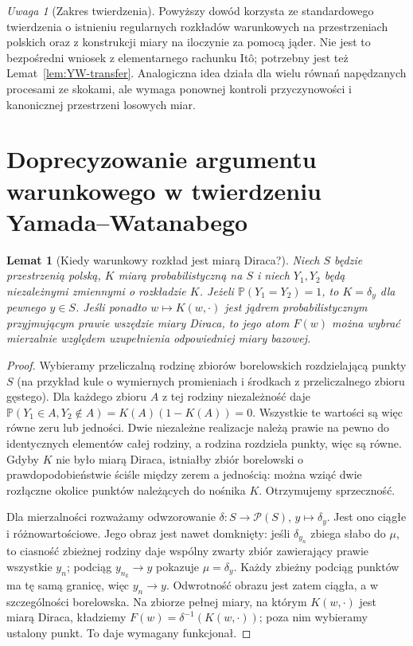 \documentclass[11pt,a4paper,oneside]{report}
\numberwithin{equation}{chapter}
\theoremstyle{plain}
\newtheorem{lemat}[twierdzenie]{Lemat}
\theoremstyle{definition}
\theoremstyle{remark}
\newtheorem{uwaga}{Uwaga}[chapter]
\newcommand{\Prob}{\mathbb{P}}
\begin{document}
\begin{uwaga}[Zakres twierdzenia]
Powyższy dowód korzysta ze standardowego twierdzenia o
istnieniu regularnych rozkładów warunkowych na przestrzeniach
polskich oraz z konstrukcji miary na iloczynie za pomocą jąder.
Nie jest to bezpośredni wniosek z elementarnego rachunku
Itô; potrzebny jest też Lemat~\ref{lem:YW-transfer}.
Analogiczna idea działa dla wielu równań napędzanych
procesami ze skokami, ale wymaga ponownej kontroli
przyczynowości i kanonicznej przestrzeni losowych miar.
\end{uwaga}


\section{Doprecyzowanie argumentu warunkowego w twierdzeniu Yamada--Watanabego}\label{sec:volIII:14:04}

\begin{lemat}[Kiedy warunkowy rozkład jest miarą Diraca?]\label{lem:volIII:14:03}
\label{lem:dirac-audit}
Niech $S$ będzie przestrzenią polską, $K$ miarą
probabilistyczną na $S$ i niech $Y_1,Y_2$ będą
niezależnymi zmiennymi o rozkładzie $K$. Jeżeli
$\Prob(Y_1=Y_2)=1$, to $K=\delta_y$ dla pewnego $y\in S$.
Jeśli ponadto $w\mapsto K(w,\cdot)$ jest jądrem
probabilistycznym przyjmującym prawie wszędzie miary
Diraca, to jego atom $F(w)$ można wybrać mierzalnie
względem uzupełnienia odpowiedniej miary bazowej.
\end{lemat}
\begin{proof}
Wybieramy przeliczalną rodzinę zbiorów borelowskich
rozdzielającą punkty $S$ (na przykład kule o wymiernych
promieniach i środkach z przeliczalnego zbioru gęstego).
Dla każdego zbioru $A$ z tej rodziny niezależność daje
$\Prob(Y_1\in A,Y_2\notin A)=K(A)(1-K(A))=0$.
Wszystkie te wartości są więc równe zeru lub jedności.
Dwie niezależne realizacje należą prawie na pewno do
identycznych elementów całej rodziny, a rodzina rozdziela
punkty, więc są równe. Gdyby $K$ nie było miarą Diraca,
istniałby zbiór borelowski o prawdopodobieństwie ściśle
między zerem a jednością: można wziąć dwie rozłączne
okolice punktów należących do nośnika $K$.
Otrzymujemy sprzeczność.

Dla mierzalności rozważamy odwzorowanie
$\delta:S\to\mathcal P(S)$, $y\mapsto\delta_y$.
Jest ono ciągłe i różnowartościowe. Jego obraz jest
nawet domknięty: jeśli $\delta_{y_n}$ zbiega słabo do
$\mu$, to ciasność zbieżnej rodziny daje wspólny
zwarty zbiór zawierający prawie wszystkie $y_n$;
podciąg $y_{n_k}\to y$ pokazuje $\mu=\delta_y$.
Każdy zbieżny podciąg punktów ma tę samą granicę,
więc $y_n\to y$. Odwrotność obrazu jest zatem
ciągła, a w szczególności borelowska. Na zbiorze pełnej miary, na którym
$K(w,\cdot)$ jest miarą Diraca, kładziemy
$F(w)=\delta^{-1}(K(w,\cdot))$; poza nim wybieramy
ustalony punkt. To daje wymagany funkcjonał.
\end{proof}
\end{document}
